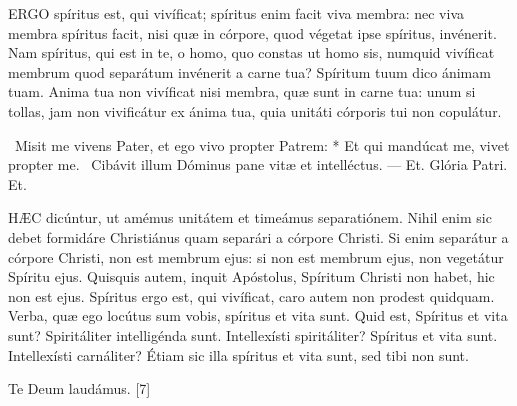 
\lettrine[lines=2]{E}{RGO} spíritus est, qui vivíficat; spíritus enim facit viva membra: nec viva membra spíritus facit, nisi quæ in córpore, quod végetat ipse spíritus, invénerit. Nam spíritus, qui est in te, o homo, quo constas ut homo sis, numquid vivíficat membrum quod separátum invénerit a carne tua? Spíritum tuum dico ánimam tuam. Anima tua non vivíficat nisi membra, quæ sunt in carne tua: unum si tollas, jam non vivificátur ex ánima tua, quia unitáti córporis tui non copulátur.

\R\ Misit me vivens Pater, et ego vivo propter Patrem: * Et qui mandúcat me, vivet propter me. \V\ Cibávit illum Dóminus pane vitæ et intelléctus. --- Et. Glória Patri. Et.


\lettrine[lines=2]{H}{ÆC} dicúntur, ut amémus unitátem et timeámus separatiónem. Nihil enim sic debet formidáre Christiánus quam separári a córpore Christi. Si enim separátur a córpore Christi, non est membrum ejus: si non est membrum ejus, non vegetátur Spíritu ejus. Quisquis autem, inquit Apóstolus, Spíritum Christi non habet, hic non est ejus. Spíritus ergo est, qui vivíficat, caro autem non prodest quidquam. Verba, quæ ego locútus sum vobis, spíritus et vita sunt. Quid est, Spíritus et vita sunt? Spiritáliter intelligénda sunt. Intellexísti spiritáliter? Spíritus et vita sunt. Intellexísti carnáliter? Étiam sic illa spíritus et vita sunt, sed tibi non sunt.

Te Deum laudámus. [7]



